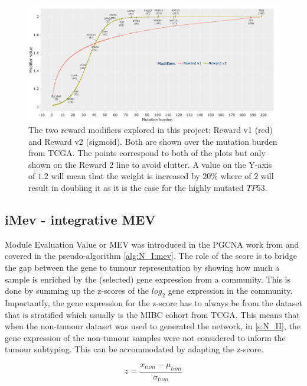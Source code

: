 \begin{figure}[H]    
    \centering
    \includegraphics[width=1.0\textwidth,height=1.0\textheight,keepaspectratio]{Sections/Network_II/validation/reward_modifiers.png}
    \caption{The two reward modifiers explored in this project: Reward v1 (red) and Reward v2 (sigmoid). Both are shown over the mutation burden from TCGA. The points correspond to both of the plots but only shown on the Reward 2 line to avoid clutter. A value on the Y-axis of $1.2$ will mean that the weight is increased by $20\%$ where of $2$ will result in doubling it as it is the case for the highly mutated $TP53$. }
    \label{fig:N_II:modifiers_comp}
\end{figure}


\subsection*{iMev - integrative MEV} \label{s:N_II:iMEV}

Module Evaluation Value or MEV was introduced in the PGCNA work from \citet{Care2019-ij} and covered in the pseudo-algorithm \cref{alg:N_I:mev}. The role of the score is to bridge the gap between the gene to tumour representation by showing how much a sample is enriched by the (selected) gene expression from a community. This is done by summing up the z-scores of the $log_2$ gene expression in the community. Importantly, the gene expression  for the z-score has to always be from the dataset that is stratified which usually is the MIBC cohort from TCGA. This means that when the non-tumour dataset was used to generated the network, in \cref{s:N_II}, the gene expression of the non-tumour samples were not considered to inform the tumour subtyping. This can be accommodated by adapting the z-score.

\begin{equation} \label{s:N_II:z_score}
z = \frac{x_{tum} - \mu_{tum}}{\sigma_{tum}}
\end{equation}

